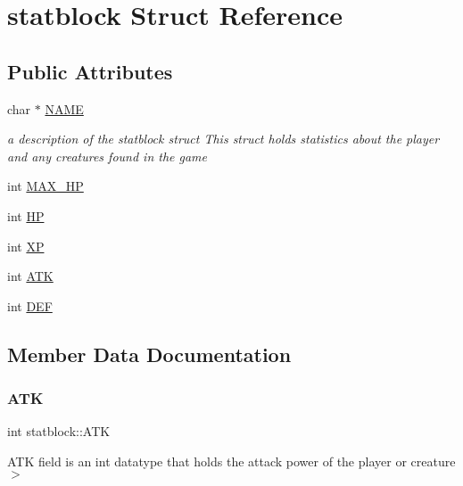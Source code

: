 \hypertarget{structstatblock}{}\section{statblock Struct Reference}
\label{structstatblock}
\subsection*{Public Attributes}
\begin{DoxyCompactItemize}
\item 
char $\ast$ \mbox{\hyperlink{structstatblock_a0b3f85d2530cb092d03989a5322ffdbb}{N\+A\+ME}}
\begin{DoxyCompactList}\small\item\em a description of the statblock struct This struct holds statistics about the player and any creatures found in the game \end{DoxyCompactList}\item 
int \mbox{\hyperlink{structstatblock_aabeab2123a62dd566ce98a2cfd3a2558}{M\+A\+X\+\_\+\+HP}}
\item 
int \mbox{\hyperlink{structstatblock_acdf7920a3342cdce3de6e994c59a4f49}{HP}}
\item 
int \mbox{\hyperlink{structstatblock_afd2fdd4e4d203624439447abd612a046}{XP}}
\item 
int \mbox{\hyperlink{structstatblock_a19582e074fbdf261038b089f4879b28f}{A\+TK}}
\item 
int \mbox{\hyperlink{structstatblock_a0f4d8f9b543179c58801381189b31791}{D\+EF}}
\end{DoxyCompactItemize}


\subsection{Member Data Documentation}
\mbox{\label{structstatblock_a19582e074fbdf261038b089f4879b28f}} 
\subsubsection{\texorpdfstring{A\+TK}{ATK}}
{\footnotesize\ttfamily int statblock\+::\+A\+TK}

A\+TK field is an int datatype that holds the attack power of the player or creature$>$ \mbox{\label{structstatblock_a0f4d8f9b543179c58801381189b31791}} 
